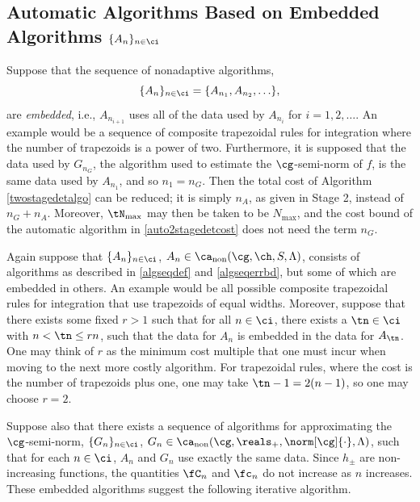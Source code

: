 \documentclass[]{elsarticle}
\DeclareMathOperator{\fix}{non}
\theoremstyle{definition}
\theoremstyle{remark}
\begin{document}
\subsection{Automatic Algorithms Based on Embedded Algorithms $\{A_n\}_{n \in \ci}$}

Suppose that the sequence of nonadaptive algorithms, 
\[
\{A_n\}_{n \in \ci} = \{A_{n_1}, A_{n_2}, \ldots \}, 
\]
are \emph{embedded}, i.e., $A_{n_{i+1}}$ uses all of the data used by $A_{n_{i}}$ for $i=1, 2, \ldots$.  An example would be a sequence of composite trapezoidal rules for integration where the number of trapezoids is a power of two. Furthermore, it is supposed that the data used by $G_{n_G}$, the algorithm used to estimate the $\cg$-semi-norm of $f$, is the same data used by $A_{n_1}$, and so $n_1=n_G$.  Then the total cost of Algorithm \ref{twostagedetalgo} can be reduced; it is simply $n_A$, as given in Stage 2, instead of $n_G+n_A$.  Moreover, $\tN_{\max}$ may then be taken to be $N_{\max}$, and the cost bound of the automatic algorithm in \eqref{auto2stagedetcost} does not need the term $n_G$.

Again suppose that $\{A_n\}_{n \in \ci}$, $A_n  \in \ca_{\fix}(\cg,\ch,S,\Lambda)$, consists of algorithms as described in  \eqref{algseqdef} and \eqref{algseqerrbd}, but some of which are embedded in others.  An example would be all possible composite trapezoidal rules for integration that use trapezoids of equal widths.   Moreover, suppose that there exists some fixed $r > 1$ such that for all $n \in \ci$, there exists a $\tn \in \ci$ with $n < \tn \le rn$, such that the data for $A_n$ is embedded in the data for $A_{\tn}$. One may think of $r$ as the minimum cost multiple that one must incur when moving to the next more costly algorithm. For trapezoidal rules, where the cost is the number of trapezoids plus one, one may take $\tn-1=2(n-1)$, so one may choose $r=2$.

Suppose also that there exists a sequence of algorithms for approximating the $\cg$-semi-norm, $\{G_n\}_{n \in \ci}$, $G_n  \in \ca_{\fix}(\cg,\reals_+,\norm[\cg]{\cdot},\Lambda)$, such that for each $n \in \ci$, $A_n$ and $G_n$ use exactly the same data.
Since $h_{\pm}$ are non-increasing functions, the quantities $\fC_{n}$ and $\fc_n$ do not increase as $n$ increases. These embedded algorithms suggest the following iterative algorithm.
\end{document}
